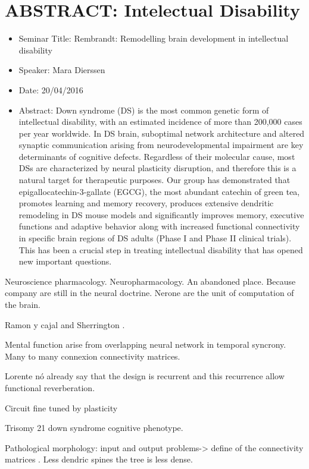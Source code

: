 \documentclass[10pt,letterpaper]{article}
\begin{document}
\section{ABSTRACT: Intelectual Disability }
\begin{itemize}
    \item Seminar Title: Rembrandt: Remodelling brain development in intellectual disability 
    \item Speaker: Mara Dierssen
    \item Date: 20/04/2016
    \item Abstract: Down syndrome (DS) is the most common genetic form of intellectual disability, with an estimated incidence of more than 200,000 cases per year worldwide. In DS brain, suboptimal network architecture and altered synaptic communication arising from neurodevelopmental impairment are key determinants of cognitive defects. Regardless of their molecular cause, most DSs are characterized by neural plasticity disruption, and therefore this is a natural target for therapeutic purposes. Our group has demonstrated that epigallocatechin-3-gallate (EGCG), the most abundant catechin of green tea, promotes learning and memory recovery, produces extensive dendritic remodeling in DS mouse models and significantly improves memory, executive functions and adaptive behavior along with increased functional connectivity in specific brain regions of DS adults (Phase I and Phase II clinical trials). This has been a crucial step in treating intellectual disability that has opened new important questions. 
\end{itemize}

Neuroscience pharmacology. Neuropharmacology.
An abandoned place. Because company are still in the neural doctrine. Nerone are the unit of computation of the brain.

Ramon y cajal and Sherrington .

Mental function arise from overlapping neural network in temporal syncrony. Many to many connexion connectivity matrices.

Lorente nó already say that the design is recurrent and this recurrence allow functional reverberation.

Circuit fine tuned by plasticity

Trisomy 21 down syndrome cognitive phenotype.

Pathological morphology: input and output problems-> define of the connectivity matrices .
Less dendric spines the tree is less dense.
\end{document}
